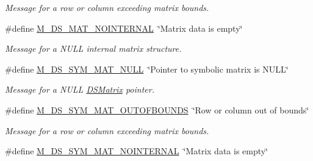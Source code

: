 \begin{DoxyCompactItemize}
\begin{DoxyCompactList}\small\item\em Message for a row or column exceeding matrix bounds. \item\end{DoxyCompactList}\item 
\hypertarget{group___m___d_s___messages_ga834bdead8f9b0e20331b57e051c7f379}{
\#define \hyperlink{group___m___d_s___messages_ga834bdead8f9b0e20331b57e051c7f379}{M\_\-DS\_\-MAT\_\-NOINTERNAL}~\char`\"{}Matrix data is empty\char`\"{}}
\label{group___m___d_s___messages_ga834bdead8f9b0e20331b57e051c7f379}

\begin{DoxyCompactList}\small\item\em Message for a NULL internal matrix structure. \item\end{DoxyCompactList}\item 
\hypertarget{group___m___d_s___messages_gab1c842ea678de8daa76a55fc68750d5e}{
\#define \hyperlink{group___m___d_s___messages_gab1c842ea678de8daa76a55fc68750d5e}{M\_\-DS\_\-SYM\_\-MAT\_\-NULL}~\char`\"{}Pointer to symbolic matrix is NULL\char`\"{}}
\label{group___m___d_s___messages_gab1c842ea678de8daa76a55fc68750d5e}

\begin{DoxyCompactList}\small\item\em Message for a NULL \hyperlink{struct_d_s_matrix}{DSMatrix} pointer. \item\end{DoxyCompactList}\item 
\hypertarget{group___m___d_s___messages_gad8ee7418e1f3268fa9841bc7d7fcf898}{
\#define \hyperlink{group___m___d_s___messages_gad8ee7418e1f3268fa9841bc7d7fcf898}{M\_\-DS\_\-SYM\_\-MAT\_\-OUTOFBOUNDS}~\char`\"{}Row or column out of bounds\char`\"{}}
\label{group___m___d_s___messages_gad8ee7418e1f3268fa9841bc7d7fcf898}

\begin{DoxyCompactList}\small\item\em Message for a row or column exceeding matrix bounds. \item\end{DoxyCompactList}\item 
\hypertarget{group___m___d_s___messages_ga24ff99c3a2bfe77b32048fa05cb19a44}{
\#define \hyperlink{group___m___d_s___messages_ga24ff99c3a2bfe77b32048fa05cb19a44}{M\_\-DS\_\-SYM\_\-MAT\_\-NOINTERNAL}~\char`\"{}Matrix data is empty\char`\"{}}
\label{group___m___d_s___messages_ga24ff99c3a2bfe77b32048fa05cb19a44}


\end{DoxyCompactItemize}
